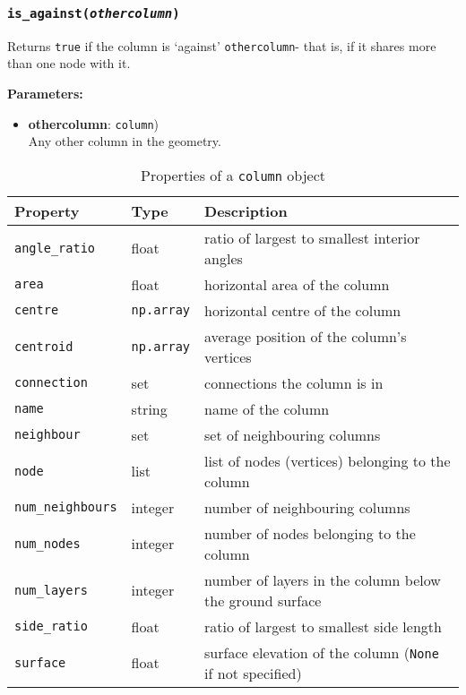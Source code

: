 \subsubsection{\texttt{is\_against(\emph{othercolumn})}}

Returns \texttt{true} if the column is `against' \texttt{othercolumn}- that is, if it shares more than one node with it.

\textbf{Parameters:}
\begin{itemize}
\item \textbf{othercolumn}: \texttt{column})\\
  Any other column in the geometry.
\end{itemize}

\begin{table}
  \begin{center}
    \begin{tabular}{|l|l|l|}
      \hline
      \textbf{Property} & \textbf{Type} & \textbf{Description}\\
      \hline
      \texttt{angle\_ratio} & float & ratio of largest to smallest interior angles \\
      \texttt{area} & float & horizontal area of the column \\
      \texttt{centre} & \texttt{np.array} & horizontal centre of the column \\
      \texttt{centroid} & \texttt{np.array} & average position of the column's vertices \\
      \texttt{connection} & set & connections the column is in \\
      \texttt{name} & string & name of the column \\
      \texttt{neighbour} & set & set of neighbouring columns \\
      \texttt{node} & list & list of nodes (vertices) belonging to the column \\
      \texttt{num\_neighbours} & integer & number of neighbouring columns \\
      \texttt{num\_nodes} & integer & number of nodes belonging to the column \\
      \texttt{num\_layers} & integer & number of layers in the column below the ground surface \\
      \texttt{side\_ratio} & float & ratio of largest to smallest side length \\
      \texttt{surface} & float & surface elevation of the column (\texttt{None} if not specified)\\
      \hline
    \end{tabular}
    \caption{Properties of a \texttt{column} object}
    \label{tb:column_properties}
  \end{center}
\end{table}

